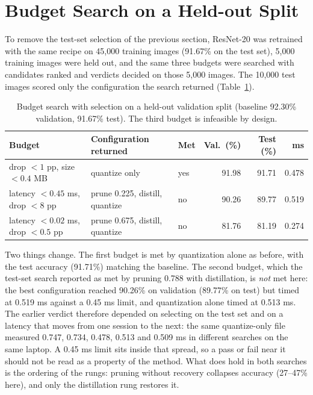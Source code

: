 \documentclass[oneside,a4paper,12pt]{report}
\begin{document}
\section{Budget Search on a Held-out Split}\label{sec:valsearch}
To remove the test-set selection of the previous section, ResNet-20 was retrained with the same recipe on 45,000 training images (91.67\% on the test set), 5,000 training images were held out, and the same three budgets were searched with candidates ranked and verdicts decided on those 5,000 images. The 10,000 test images scored only the configuration the search returned (Table~\ref{tab:valsearch}).

\begin{table}[!htbp]
\centering
\small
\setlength{\tabcolsep}{4pt}
\begin{tabularx}{\textwidth}{@{}X X l r r r@{}}
\toprule
Budget & Configuration returned & Met & Val.\ (\%) & Test (\%) & ms\\
\midrule
drop $<1$ pp, size $<0.4$ MB & quantize only & yes & 91.98 & 91.71 & 0.478\\
latency $<0.45$ ms, drop $<8$ pp & prune 0.225, distill, quantize & no & 90.26 & 89.77 & 0.519\\
latency $<0.02$ ms, drop $<0.5$ pp & prune 0.675, distill, quantize & no & 81.76 & 81.19 & 0.274\\
\bottomrule
\end{tabularx}
\caption{Budget search with selection on a held-out validation split (baseline 92.30\% validation, 91.67\% test). The third budget is infeasible by design.}
\label{tab:valsearch}
\end{table}

Two things change. The first budget is met by quantization alone as before, with the test accuracy (91.71\%) matching the baseline. The second budget, which the test-set search reported as met by pruning 0.788 with distillation, is \emph{not} met here: the best configuration reached 90.26\% on validation (89.77\% on test) but timed at 0.519 ms against a 0.45 ms limit, and quantization alone timed at 0.513 ms. The earlier verdict therefore depended on selecting on the test set and on a latency that moves from one session to the next: the same quantize-only file measured 0.747, 0.734, 0.478, 0.513 and 0.509 ms in different searches on the same laptop. A 0.45 ms limit sits inside that spread, so a pass or fail near it should not be read as a property of the method. What does hold in both searches is the ordering of the rungs: pruning without recovery collapses accuracy (27--47\% here), and only the distillation rung restores it.
\end{document}
